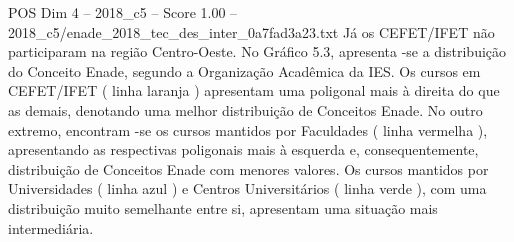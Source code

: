 \begin{textsample}{POS Dim 4 – 2018\_c5 – Score 1.00 – 2018\_c5/enade\_2018\_tec\_des\_inter\_0a7fad3a23.txt}
Já os CEFET/IFET não participaram na região Centro-Oeste.
No Gráfico 5.3, apresenta -se a distribuição do Conceito Enade, segundo a Organização Acadêmica da IES.
Os cursos em CEFET/IFET ( linha laranja ) apresentam uma poligonal mais à direita do que as demais, denotando uma melhor distribuição de Conceitos Enade.
No outro extremo, encontram -se os cursos mantidos por Faculdades ( linha vermelha ), apresentando as respectivas poligonais mais à esquerda e, consequentemente, distribuição de Conceitos Enade com menores valores.
Os cursos mantidos por Universidades ( linha azul ) e Centros Universitários ( linha verde ), com uma distribuição muito semelhante entre si, apresentam uma situação mais intermediária.

\end{textsample}

